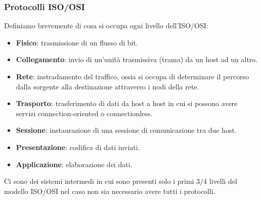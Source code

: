 \subsubsection{Protocolli ISO/OSI}
Definiamo brevemente di cosa si occupa ogni livello dell'ISO/OSI:
\begin{itemize}
	\item \textbf{Fisico}: trasmissione di un flusso di bit.
	\item \textbf{Collegamento}: invio di un'unità trasmissiva (trama) da un host ad un altro.
	\item \textbf{Rete}: instradamento del traffico, ossia si occupa di determinare il percorso 
		dalla sorgente alla destinazione attraverso i nodi della rete.
	\item \textbf{Trasporto}: trasferimento di dati da host a host in cui si possono avere servizi
		connection-oriented o connectionless.
	\item \textbf{Sessione}: instaurazione di una sessione di comunicazione tra due host.
	\item \textbf{Presentazione}: codifica di dati inviati.
	\item \textbf{Applicazione}: elaborazione dei dati.
\end{itemize}
Ci sono dei sistemi intermedi in cui sono presenti solo i primi 3/4 livelli del modello ISO/OSI
nel caso non sia necessario avere tutti i protocolli.
